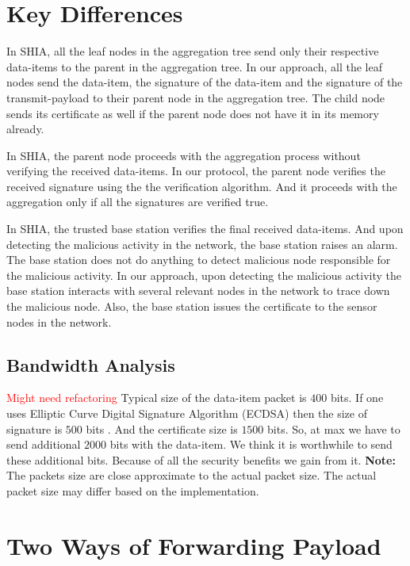 \section{Key Differences}

	In SHIA, all the leaf nodes in the aggregation tree send only their respective data-items to the parent in the aggregation tree.
	In our approach, all the leaf nodes send the data-item, the signature of the data-item and the signature of the transmit-payload to their parent node in the aggregation tree. 
	The child node sends its certificate as well if the parent node does not have it in its memory already.

	In SHIA, the parent node proceeds with the aggregation process without verifying the received data-items.
	In our protocol, the parent node verifies the received signature using the the verification algorithm.
	And it proceeds with the aggregation only if all the signatures are verified true.

	In SHIA, the trusted base station verifies the final received data-items.
	And upon detecting the malicious activity in the network, the base station raises an alarm. 
	The base station does not do anything to detect malicious node responsible for the malicious activity.
	In our approach, upon detecting the malicious activity the base station interacts with several relevant nodes in the network to trace down the malicious node.
	Also, the base station issues the certificate to the sensor nodes in the network.
	
	\subsection{Bandwidth Analysis}
	
		\textcolor{red}{Might need refactoring}
		Typical size of the data-item packet is $400$ bits.
		If one uses Elliptic Curve Digital Signature Algorithm (ECDSA) then the size of signature is $500$ bits \cite{ecdsa2009186}.
		And the certificate size is $1500$ bits.
		So, at max we have to send additional $2000$ bits with the data-item.
		We think it is worthwhile to send these additional bits.
		Because of all the security benefits we gain from it. 
		\textbf{Note:} The packets size are close approximate to the actual packet size. 
		The actual packet size may differ based on the implementation.

\section{Two Ways of Forwarding Payload}	
	
